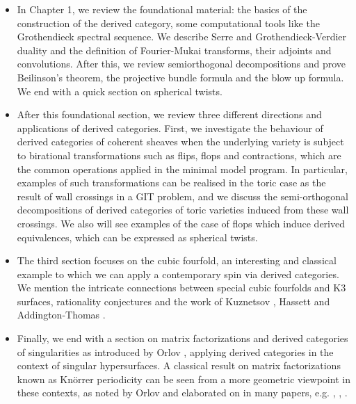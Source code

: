 \begin{itemize}
    \item In Chapter 1, we review the foundational material: the basics of the construction of the derived category, some computational tools like the Grothendieck spectral sequence. We describe Serre and Grothendieck-Verdier duality and the definition of Fourier-Mukai transforms, their adjoints and convolutions. After this, we review semiorthogonal decompositions and prove Beilinson's theorem, the projective bundle formula and the blow up formula. We end with a quick section on spherical twists.
    \item After this foundational section, we review three different directions and applications of derived categories. First, we investigate the behaviour of derived categories of coherent sheaves when the underlying variety is subject to birational transformations such as flips, flops and contractions, which are the common operations applied in the minimal model program. In particular, examples of such transformations can be realised in the toric case as the result of wall crossings in a GIT problem, and we  discuss the semi-orthogonal decompositions of derived categories of toric varieties induced from these wall crossings. We also will see examples of the case of flops which induce derived equivalences, which can be expressed as spherical twists. 
    \item The third section focuses on the cubic fourfold, an interesting and classical example to which we can apply a contemporary spin via derived categories. We mention the intricate connections between special cubic fourfolds and K3 surfaces, rationality conjectures and the work of Kuznetsov \cite{KuznetsovDerivedCubic}, Hassett \cite{hassett_special_2000} and Addington-Thomas \cite{addington_hodge_2014}. 
    \item Finally, we end with a section on matrix factorizations and derived categories of singularities as introduced by Orlov \cite{OrlovSingularities}, applying derived categories in the context of singular hypersurfaces. A classical result on matrix factorizations known as Kn\"orrer periodicity can be seen from a more geometric viewpoint in these contexts, as noted by Orlov and elaborated on in many papers, e.g. \cite{OrlovKnorrer}, \cite{Shipman}, \cite{Hirano}.
\end{itemize}
